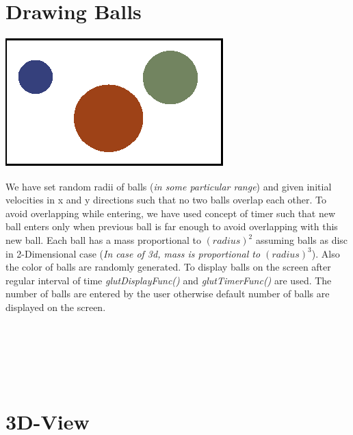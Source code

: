 \documentclass[a4paper,12pt]{report}
\begin{document}
\section{Drawing Balls}
\begin{center}
\includegraphics[height=5cm]{myballs.png}\\
\end{center}
We have set random radii of balls (\textit{in some particular range}) and given initial velocities in x and y directions such that no two balls overlap each other. To avoid overlapping while entering, we have used concept of timer such that new ball enters only when previous ball is far enough to avoid overlapping with this new ball. Each ball has a mass proportional to $(radius)^2$  assuming balls as disc in 2-Dimensional case (\textit{In case of 3d, mass is proportional to $(radius)^3$}). Also the color of balls are randomly generated. To display balls on the screen after regular interval of time  \textit{glutDisplayFunc()} and \textit{glutTimerFunc()} are used. The number of balls are entered by the user otherwise default number of balls are displayed on the screen.\\\\\\\\\\\\

\section{3D-View}
\end{document}
